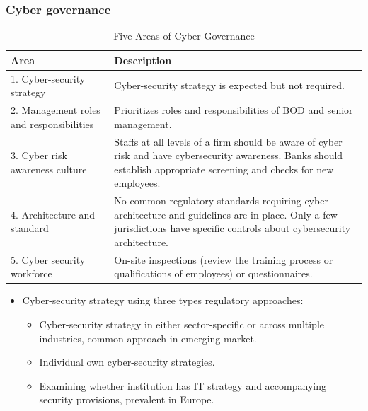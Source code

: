 \subsubsection{Cyber governance }
\begin{table}[H]
    \centering
    \caption{Five Areas of Cyber Governance}
    \renewcommand{\arraystretch}{1.5} %

    \begin{tabular}{|p{5cm}|p{13cm}|}
        \hline
        \textbf{Area} & \textbf{Description} \\ \hline
        1. Cyber-security strategy & Cyber-security strategy is expected but not required. \\ \hline
        2. Management roles and responsibilities & Prioritizes roles and responsibilities of BOD and senior management. \\ \hline
        3. Cyber risk awareness culture & Staffs at all levels of a firm should be aware of cyber risk and have cybersecurity awareness. Banks should establish appropriate screening and checks for new employees. \\ \hline
        4. Architecture and standard & No common regulatory standards requiring cyber architecture and guidelines are in place. Only a few jurisdictions have specific controls about cybersecurity architecture. \\ \hline
        5. Cyber security workforce & On-site inspections (review the training process or qualifications of employees) or questionnaires. \\ \hline
    \end{tabular}
\end{table}

\begin{itemize}
\item Cyber-security strategy using three types regulatory approaches:
    \begin{itemize}
    \item Cyber-security strategy in either sector-specific or across multiple industries, common approach in emerging market.
    \item Individual own cyber-security strategies.
    \item Examining whether institution has IT strategy and accompanying security provisions, prevalent in Europe.
    \end{itemize}
\end{itemize}




